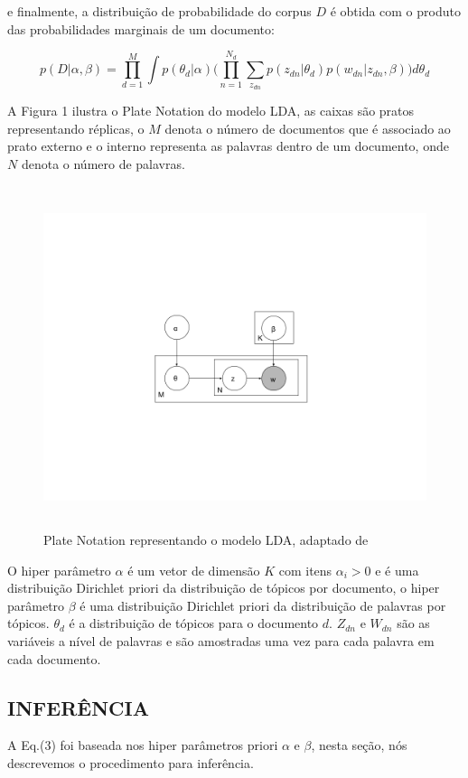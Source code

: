 \documentclass[12pt,a4paper]{article}
\begin{document}
e finalmente, a distribuição de probabilidade do corpus $D$ é obtida com o produto das probabilidades marginais de um documento:

\begin{equation}
p(D|\alpha,\beta)= \prod_{d=1}^{M} \int{p(\theta _d|\alpha)\Bigg(\prod_{n=1}^{N_d}\sum_{z_{dn}} p(z_{dn}|\theta _d)p(w_{dn}|z_{dn},\beta)\Bigg)d\theta _d}
\end{equation}


A Figura 1 ilustra o Plate Notation do modelo LDA, as caixas são pratos representando réplicas,
o $M$ denota o número de documentos que é associado ao prato externo e o interno representa as palavras dentro de um documento, onde $N$ denota o número de palavras.

\begin{figure}[H]
 \centering
   \includegraphics[height=10cm]{images/figure_1.png}
   \caption{Plate Notation representando o modelo LDA, adaptado de }
\end{figure}

O hiper parâmetro $\alpha$ é um vetor de dimensão $K$ com itens \(\alpha _i>0\) e é uma distribuição Dirichlet priori da distribuição de tópicos por documento,
o hiper parâmetro $\beta$ é uma distribuição Dirichlet priori da distribuição de palavras por tópicos. $\theta _d$ é a distribuição de tópicos para o documento $d$. $Z_{dn}$ e $W_{dn}$ são as variáveis a nível de palavras e são amostradas uma vez para cada palavra em cada documento.


\subsection{INFERÊNCIA}
A Eq.(3) foi baseada nos hiper parâmetros priori $\alpha$ e $\beta$, nesta seção, nós descrevemos o procedimento para inferência.
\end{document}
